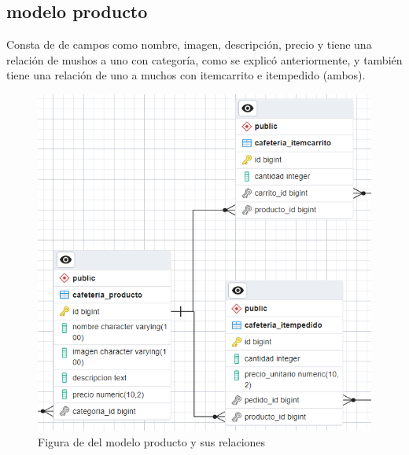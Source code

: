 \documentclass{article}
\begin{document}
	\subsection{modelo producto}
	Consta de de campos como nombre, imagen, descripción, precio y tiene una relación de mushos a uno con categoría, como se explicó anteriormente, y también tiene una relación de uno a muchos con itemcarrito e itempedido (ambos).
	\begin{figure}[h!]
		\centering
		\includegraphics[width=1\linewidth]{img/modProducto}
		\caption{Figura de del modelo producto y sus relaciones}
		\label{fig:modproducto}
	\end{figure}
	\newpage
\end{document}
